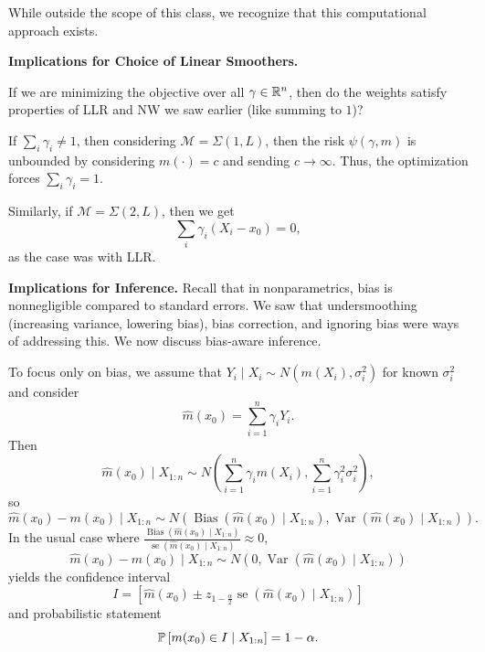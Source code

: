 While outside the scope of this class, we recognize that this computational approach exists.

\textbf{Implications for Choice of Linear Smoothers.}

If we are minimizing the objective over all $\gamma \in \R^n$, then do the weights satisfy properties of LLR and NW we saw earlier (like summing to $1$)? 

\begin{example}	If $\sum_i \gamma_i \ne 1$, then considering $\mathscr{M} = \Sigma(1,L)$, then the risk $\psi(\gamma,m)$ is unbounded by considering $m(\cdot ) = c$ and sending $c \to \infty$. Thus, the optimization forces $\sum_i \gamma_i = 1$.

	Similarly, if $\mathscr{M} = \Sigma(2,L)$, then we get \[
		\sum_i \gamma_i(X_i-x_0) = 0
	,\] as the case was with LLR.
\end{example}

\textbf{Implications for Inference.} Recall that in nonparametrics, bias is nonnegligible compared to standard errors. We saw that undersmoothing (increasing variance, lowering bias), bias correction, and ignoring bias were ways of addressing this.
We now discuss bias-aware inference.

To focus only on bias, we assume that $Y_i \mid X_i \sim N(m(X_i), \sigma_i^2)$ for known $\sigma_i^2$ and consider \[
	\hat{m}(x_0) = \sum\limits_{i=1}^{n} \gamma_i Y_i
.\] Then \[
	\hat{m}(x_0) \mid X_{1:n} \sim N\left( \sum\limits_{i=1}^{n} \gamma_i m(X_i), \sum\limits_{i=1}^{n} \gamma_i^2\sigma_i^2 \right)
,\] 
so \[
	\hat{m}(x_0) - m(x_0) \mid X_{1:n} \sim N\left( \operatorname{Bias}\left(\hat{m}(x_0) \mid X_{1:n}\right), \operatorname{Var}\left(\hat{m}(x_0) \mid X_{1:n}\right) \right)
.\] 
In the usual case where $\frac{\operatorname{Bias}\left(\hat{m}(x_0) \mid X_{1:n}\right)}{\operatorname{se}\left(\hat{m}(x_0) \mid X_{1:n}\right) }\approx 0$, \[
	\hat{m}(x_0) - m(x_0) \mid X_{1:n} \sim N\left( 0, \operatorname{Var}\left(\hat{m}(x_0) \mid X_{1:n}\right) \right)
\] yields the confidence interval \[
	I = \left[ \hat{m}(x_0) \pm z_{1-\frac{\alpha}{2}} \operatorname{se}\left(\hat{m}(x_0) \mid X_{1:n}\right)  \right]
\] 
and probabilistic statement \[
	\P\left[m(x_0) \in I \mid X_{1:n}\right] = 1-\alpha
.\] 

